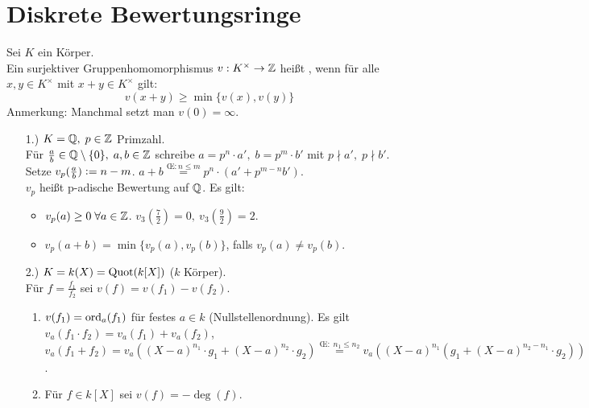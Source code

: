 \documentclass[a4paper, 10pt]{report}
\begin{document}
\section{Diskrete Bewertungsringe}

\begin{Def} 
Sei $K$ ein Körper.\\
Ein surjektiver Gruppenhomomorphismus $v: K^{\times} \to \mathbb{Z}$ heißt
, wenn für alle $x,y \in
K^{\times}$ mit $x + y \in K^{\times}$ gilt:
$$ v(x+y) \geq \min\{v(x),v(y)\}$$
Anmerkung: Manchmal setzt man $v(0) = \infty$.
\end{Def}

\begin{nnBsp} 
\begin{enumerate}
  \item[1.)] $K = \mathbb{Q}, \; p \in \mathbb{Z}$ Primzahl.\\
  Für $\frac{a}{b} \in \mathbb{Q} \setminus \{0\}, \; a,b \in \mathbb{Z}$
  schreibe $a = p^n \cdot a', \; b = p^m \cdot b'$ mit $p \nmid a',\; p \nmid
  b'$.\\
  Setze $v_p(\frac{a}{b}) \mathrel{\mathop:}= n - m$.
  $a + b \overset{\text{\OE}: n \leq m}{=} p^n \cdot (a' + p^{m-n} b')$.\\
  $v_p$ heißt p-adische Bewertung auf $\mathbb{Q}$. Es gilt:
  \begin{itemize}
    \item $v_p(a) \geq 0 \; \forall a \in \mathbb{Z}$. $v_3(\frac{7}{2}) = 0, \ 
    v_3(\frac{9}{2})= 2$.
    \item $v_p(a+b) = \min\{v_p(a),v_p(b)\}$, falls $v_p(a) \not= v_p(b)$.
  \end{itemize}
  \item[2.)] $K = k(X) = \Quot{k[X]}$ ($k$ Körper).\\
  Für $f = \frac{f_1}{f_2}$ sei $v(f) = v(f_1) - v(f_2)$.
  \begin{enumerate}
    \item $v(f_1) = \mathrm{ord}_{a}(f_1)$ für festes $a \in k$
    (Nullstellenordnung).
    Es gilt $v_a(f_1 \cdot f_2) = v_a(f_1) + v_a(f_2)$, 
    $v_a(f_1 + f_2) = v_a((X-a)^{n_1} \cdot g_1 + (X-a)^{n_2} \cdot g_2)
    \overset{\text{\OE}: \; n_1 \leq n_2}{=} v_a((X-a)^{n_1}(g_1 + (X-a)^{n_2 - 
    n_1} \cdot g_2))$.
    \item Für $f \in k[X]$ sei $v(f) = - \deg (f)$.
  \end{enumerate}
\end{enumerate}
\end{nnBsp}
\end{document}

